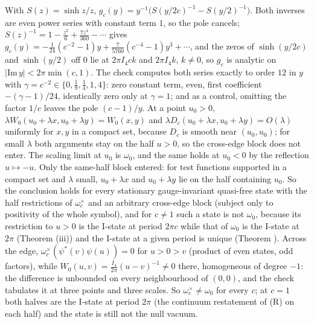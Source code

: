 With $S(z) = \sinh z/z$, $g_{c}(y) = y^{-1}\big(S(y/2c)^{-1} - S(y/2)^{-1}\big)$. Both inverses are even power series with constant term $1$, so the pole cancels; $S(z)^{-1} = 1 - \tfrac{z^{2}}{6} + \tfrac{7z^{4}}{360} - \cdots$ gives $g_{c}(y) = -\tfrac{1}{24}(c^{-2} - 1)y + \tfrac{7}{5760}(c^{-4} - 1)y^{3} + \cdots$, and the zeros of $\sinh(y/2c)$ and $\sinh(y/2)$ off $0$ lie at $2\pi I_{4}c k$ and $2\pi I_{4}k$, $k \neq 0$, so $g_{c}$ is analytic on $|\mathrm{Im}\,y| < 2\pi\min(c, 1)$. The check computes both series exactly to order $12$ in $y$ with $\gamma = c^{-2} \in \{0, \tfrac19, \tfrac14, 1, 4\}$: zero constant term, even, first coefficient $-(\gamma - 1)/24$, identically zero only at $\gamma = 1$; and as a control, omitting the factor $1/c$ leaves the pole $(c - 1)/y$. At a point $u_{0} > 0$, $\lambda W_{0}(u_{0} + \lambda x, u_{0} + \lambda y) = W_{0}(x, y)$ and $\lambda D_{c}(u_{0} + \lambda x, u_{0} + \lambda y) = O(\lambda)$ uniformly for $x, y$ in a compact set, because $D_{c}$ is smooth near $(u_{0}, u_{0})$; for small $\lambda$ both arguments stay on the half $u > 0$, so the cross-edge block does not enter. The scaling limit at $u_{0}$ is $\omega_{0}$, and the same holds at $u_{0} < 0$ by the reflection $u \mapsto -u$. Only the same-half block entered: for test functions supported in a compact set and $\lambda$ small, $u_{0} + \lambda x$ and $u_{0} + \lambda y$ lie on the half containing $u_{0}$. So the conclusion holds for every stationary gauge-invariant quasi-free state with the half restrictions of $\omega_{c}^{\times}$ and an arbitrary cross-edge block (subject only to positivity of the whole symbol), and for $c \neq 1$ such a state is not $\omega_{0}$, because its restriction to $u > 0$ is the I-state at period $2\pi c$ while that of $\omega_{0}$ is the I-state at $2\pi$ (Theorem (iii)) and the I-state at a given period is unique (Theorem ). Across the edge, $\omega_{c}^{\times}(\psi^{*}(v)\psi(u)) = 0$ for $u > 0 > v$ (product of even states, odd factors), while $W_{0}(u, v) = \tfrac{I_{4}}{2\pi}(u - v)^{-1} \neq 0$ there, homogeneous of degree $-1$: the difference is unbounded on every neighbourhood of $(0, 0)$, and the check tabulates it at three points and three scales. So $\omega_{c}^{\times} \neq \omega_{0}$ for every $c$; at $c = 1$ both halves are the I-state at period $2\pi$ (the continuum restatement of (R) on each half) and the state is still not the null vacuum.
